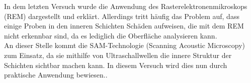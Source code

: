 In dem letzten Versuch wurde die Anwendung des Rasterelektronenmikroskops (REM) dargestellt und erklärt. Allerdings tritt häufig das Problem auf, dass einige Proben in den inneren Schichten Schäden aufweisen, die mit dem REM nicht erkennbar sind, da es lediglich die Oberfläche analysieren kann.\\ An dieser Stelle kommt die SAM-Technologie (Scanning Acoustic Microscopy) zum Einsatz, da sie mithilfe von Ultraschallwellen die innere Struktur der Schichten sichtbar machen kann. In diesem Versuch wird dies nun durch praktische Anwendung bewiesen..